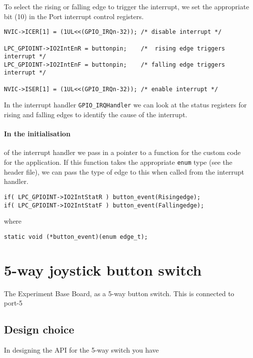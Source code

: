 \documentclass[a4paper]{tufte-handout}
\begin{document}
To select the rising or falling edge to trigger the interrupt, we set
the appropriate bit (10) in the Port interrupt control registers.

\begin{verbatim}
NVIC->ICER[1] = (1UL<<(GPIO_IRQn-32)); /* disable interrupt */

LPC_GPIOINT->IO2IntEnR = buttonpin;    /*  rising edge triggers interrupt */
LPC_GPIOINT->IO2IntEnF = buttonpin;    /* falling edge triggers interrupt */
	
NVIC->ISER[1] = (1UL<<(GPIO_IRQn-32)); /* enable interrupt */
\end{verbatim}

In the interrupt handler \texttt{GPIO_IRQHandler} we can look
at the status registers for rising and falling edges to identify the
cause of the interrupt.

\paragraph{In the initialisation} of the interrupt handler we pass in
a pointer to a function for the custom code for the application.  If
this function takes the appropriate \texttt{enum} type (see the
header file), we can pass the type of edge to this when called from
the interrupt handler.
\begin{verbatim}
if( LPC_GPIOINT->IO2IntStatR ) button_event(Risingedge);
if( LPC_GPIOINT->IO2IntStatF ) button_event(Fallingedge);
\end{verbatim}
where
\begin{verbatim}
static void (*button_event)(enum edge_t);
\end{verbatim}

\section{5-way joystick button switch}
The Experiment Base Board, as a 5-way button switch.  This is
connected to port-5

\subsection{Design choice}
In designing the API for the 5-way switch you have 



\appendix
\end{document}
